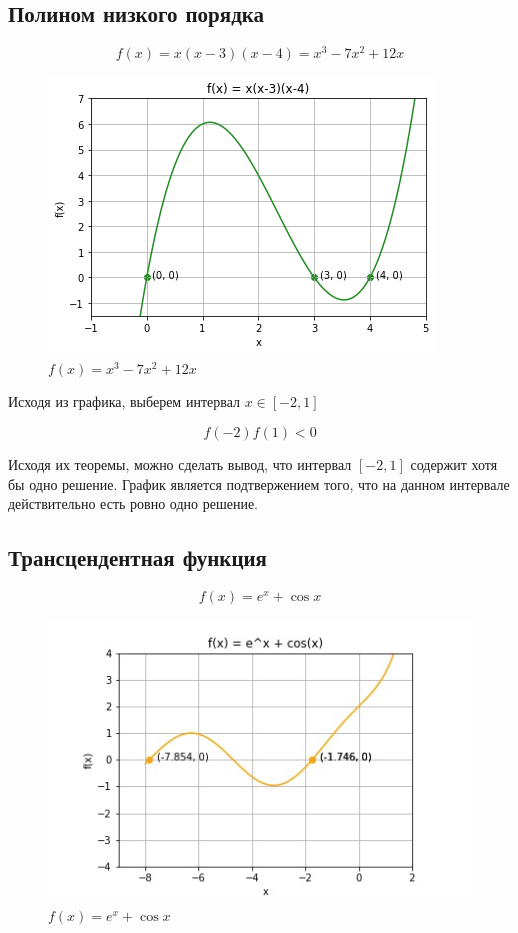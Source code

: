 \documentclass[a4paper,12pt]{extarticle}
\begin{document}
    \subsection{Полином низкого порядка}

    \[
        f(x) = x(x-3)(x-4) = x^3 - 7x^2 + 12x
    \]

    \begin{figure}[h!]
        \centering
        \includegraphics[height=0.5\linewidth]{1.png}
        \caption{$f(x) = x^3 - 7x^2 + 12x$}
    \end{figure}

    Исходя из графика, выберем интервал $x \in [-2, 1]$

    \[
        f(-2)f(1) < 0
    \]

    Исходя их теоремы, можно сделать вывод, что интервал $[-2, 1]$ содержит хотя бы одно решение.
    График является подтвержением того, что на данном интервале действительно есть ровно одно решение.

    \newpage

    \subsection{Трансцендентная функция}

    \[
        f(x) = e^x + \cos x
    \]

    \begin{figure}[h!]
        \centering
        \includegraphics[height=0.6\linewidth]{2.jpg}
        \caption{$f(x) = e^x + \cos x$}
    \end{figure}
\end{document}
